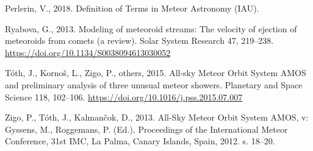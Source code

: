 \leavevmode\hypertarget{ref-imo-meteor}{}%
Perlerin, V., 2018. Definition of Terms in Meteor Astronomy (IAU).

\leavevmode\hypertarget{ref-ryabova2013}{}%
Ryabova, G., 2013. Modeling of meteoroid streams: The velocity of
ejection of meteoroids from comets (a review). Solar System Research 47,
219--238. \url{https://doi.org/10.1134/S0038094613030052}

\leavevmode\hypertarget{ref-toth2015}{}%
Tóth, J., Kornoš, L., Zigo, P., others, 2015. All-sky Meteor Orbit
System AMOS and preliminary analysis of three unusual meteor showers.
Planetary and Space Science 118, 102--106.
\url{https://doi.org/10.1016/j.pss.2015.07.007}

\leavevmode\hypertarget{ref-zigo2013}{}%
Zigo, P., Tóth, J., Kalmančok, D., 2013. All-Sky Meteor Orbit System
AMOS, v: Gyssens, M., Roggemans, P. (Ed.), Proceedings of the
International Meteor Conference, 31st IMC, La Palma, Canary Islands,
Spain, 2012. s. 18--20.

